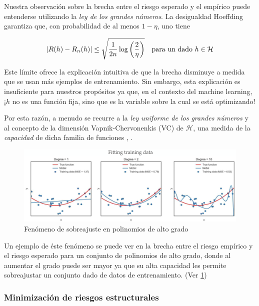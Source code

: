 Nuestra observaci\'on sobre la brecha entre el riesgo esperado y el emp\'irico puede entenderse utilizando la \textit{ley de los grandes n\'umeros}. La desigualdad Hoeffding \cite{hoeffding:1962} garantiza que, con probabilidad de al menos $1 - \eta$, uno tiene

\begin{equation}
\left\lvert R(h) - R_n(h)\right\rvert \leq \sqrt{\frac{1}{2n} \log\left(\frac{2}{\eta}\right)} \quad \text{para un dado } h \in \mathcal{H}
\end{equation}

Este l\'imite ofrece la explicaci\'on intuitiva de que la brecha disminuye a medida que se usan m\'as ejemplos de entrenamiento. Sin embargo, esta explicaci\'on es insuficiente para nuestros prop\'ositos ya que, en el contexto del machine learning, ¡$h$ no es una funci\'on fija, sino que es la variable sobre la cual se est\'a optimizando!

Por esta raz\'on, a menudo se recurre a la \textit{ley uniforme de los grandes n\'umeros} y al concepto de la dimensi\'on Vapnik-Chervonenkis (VC) de $\mathcal{H} $, una medida de la \textit{capacidad} de dicha familia de funciones \cite{vapnik:1971}, \cite{mohri:2012}. 

\begin{figure}[h]
	\centering
	\includegraphics[scale=.3]{gfx/overfitting.png}
	\caption{Fen\'omeno de sobreajuste en polinomios de alto grado}
	\label{gfx: overfitting}
\end{figure}


Un ejemplo de \'este fen\'omeno se puede ver en la brecha entre el riesgo emp\'irico y el riesgo esperado para un conjunto de polinomios de alto grado, donde al aumentar el grado puede ser mayor ya que su alta capacidad les permite sobreajustar un conjunto dado de datos de entrenamiento. (Ver \ref{gfx: overfitting})

\subsubsection{Minimizaci\'on de riesgos estructurales}


